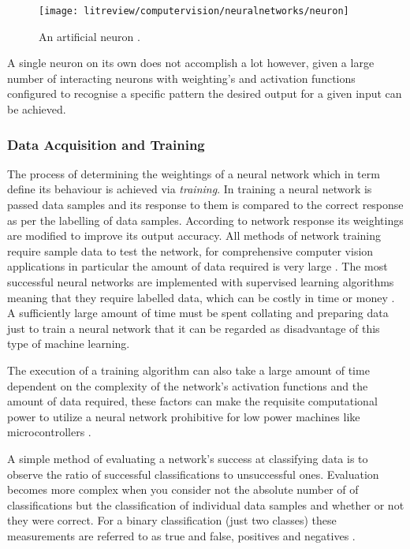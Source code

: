\begin{figure}[h]
    \centering
    \texttt{[image: litreview/computervision/neuralnetworks/neuron]}
    \caption{An artificial neuron \cite{ann_handbook}.}
    \label{fig:neuron}
\end{figure}

A single neuron on its own does not accomplish a lot however, given a large number of interacting neurons with weighting's and activation functions configured to recognise a specific pattern the desired output for a given input can be achieved.

\subsubsection{Data Acquisition and Training}

The process of determining the weightings of a neural network which in term define its behaviour is achieved via \emph{training}. In training a neural network is passed data samples and its response to them is compared to the correct response as per the labelling of data samples. According to network response its weightings are modified to improve its output accuracy. All methods of network training require sample data to test the network, for comprehensive computer vision applications in particular the amount of data required is very large \cite{large_data_neural_network}. The most successful neural networks are implemented with supervised learning algorithms meaning that they require labelled data, which can be costly in time or money \cite{patterns_machine_learning} \cite{supervised_neural_networks}. A sufficiently large amount of time must be spent collating and preparing data just to train a neural network \cite{data_labelling} that it can be regarded as disadvantage of this type of machine learning.

The execution of a training algorithm can also take a large amount of time dependent on the complexity of the network's activation functions and the amount of data required, these factors can make the requisite computational power to utilize a neural network prohibitive for low power machines like microcontrollers \cite{computations_neural_network}. 

A simple method of evaluating a network's success at classifying data is to observe the ratio of successful classifications to unsuccessful ones. Evaluation becomes more complex when you consider not the absolute number of of classifications but the classification of individual data samples and whether or not they were correct. For a binary classification (just two classes) these measurements are referred to as true and false, positives and negatives \cite{neural_networks}. 

